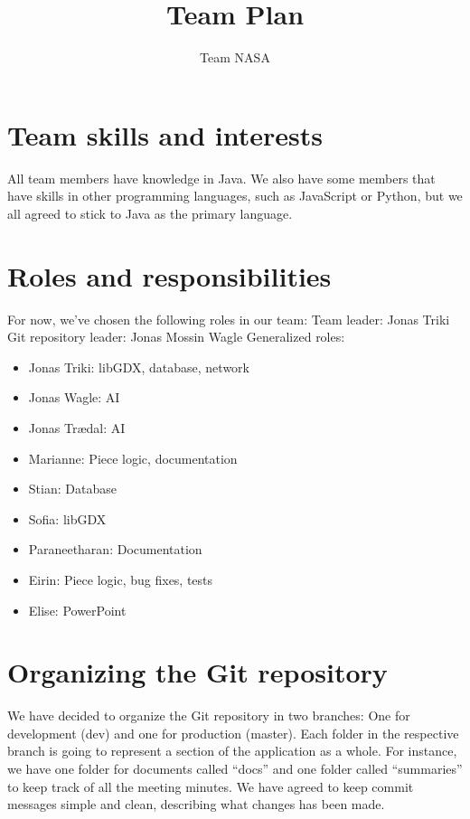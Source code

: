 \documentclass{article}
\title{Team Plan}
\author{Team NASA}
\date{}
\begin{document}
\maketitle

\section*{Team skills and interests}
All team members have knowledge in Java. We also have some members that have skills in other programming languages, such as JavaScript or Python, but we all agreed to stick to Java as the primary language.

\section*{Roles and responsibilities}
For now, we've chosen the following roles in our team:
\newline Team leader: Jonas Triki
\newline Git repository leader: Jonas Mossin Wagle
\newline Generalized roles:
\begin{itemize}
    \item Jonas Triki: libGDX, database, network
    \item Jonas Wagle: AI
    \item Jonas Trædal: AI 
    \item Marianne: Piece logic, documentation
    \item Stian: Database
    \item Sofia: libGDX
    \item Paraneetharan: Documentation
    \item Eirin: Piece logic, bug fixes, tests
    \item Elise: PowerPoint
    
\end{itemize}



\section*{Organizing the Git repository}

We have decided to organize the Git repository in two branches: One for development (dev) and one for production (master). Each folder in the respective branch is going to represent a section of the application as a whole. For instance, we have one folder for documents called “docs” and one folder called “summaries” to keep track of all the meeting minutes. We have agreed to keep commit messages simple and clean, describing what changes has been made.
\end{document}
